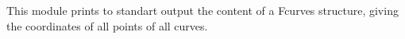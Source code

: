 This module prints to standart output the content of a Fcurves structure,
giving the coordinates of all points of all curves.
